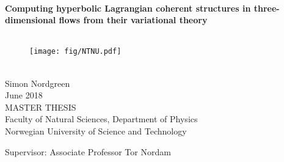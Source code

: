 
\thispagestyle{empty}
\mbox{}\\[3pc]
\begin{center}

\Huge{\textbf{Computing hyperbolic Lagrangian coherent structures in three-dimensional flows from their variational theory}}\\[2pc]

\mbox{}\\[1pc]

\begin{figure}[h!] 
\centering
\texttt{[image: fig/NTNU.pdf]}
\end{figure}

\mbox{}\\[1pc]

\Large{Simon Nordgreen}\\[1pc]
\large{June 2018}\\[2pc]

MASTER THESIS\\
Faculty of Natural Sciences, Department of Physics\\
Norwegian University of Science and Technology
\end{center}
\vfill

\noindent Supervisor: Associate Professor Tor Nordam

